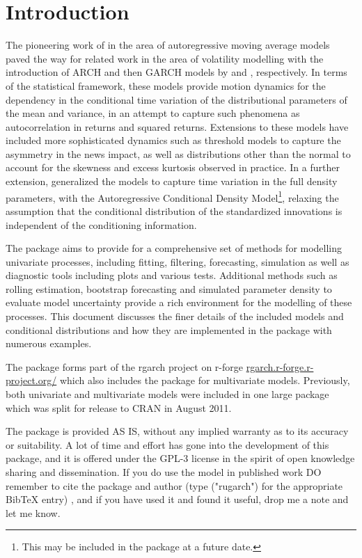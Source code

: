 \section{Introduction}
The pioneering work of \citet{Box2} in the area of autoregressive moving
average models paved the way for related work in the area of volatility
modelling with the introduction of ARCH and then GARCH models by \citet{Engle1}
and \citet{Bollerslev1}, respectively. In terms of the statistical framework,
these models provide motion dynamics for the dependency in the conditional
time variation of the distributional parameters of the mean and variance, in an
attempt to capture such phenomena as autocorrelation in returns and squared
returns. Extensions to these models have included more sophisticated dynamics
such as threshold models to capture the asymmetry in the news impact, as well
as distributions other than the normal to account for the skewness and excess
kurtosis observed in practice. In a further extension, \citet{HANSEN2}
generalized the \verb@GARCH@ models to capture time variation in the full density
parameters, with the Autoregressive Conditional Density Model\footnote{This may
be included in the package at a future date.}, relaxing the assumption that the
conditional distribution of the standardized innovations is independent of the
conditioning information.

The \verb@rugarch@ package aims to provide for a comprehensive set of methods
for modelling univariate \verb@GARCH@ processes, including fitting, filtering,
forecasting, simulation as well as diagnostic tools including plots and various
tests. Additional methods such as rolling estimation, bootstrap forecasting and
simulated parameter density to evaluate model uncertainty provide a rich
environment for the modelling of these processes. This document discusses the
finer details of the included models and conditional distributions and
how they are implemented in the package with numerous examples.

The \verb@rugarch@ package forms part of the rgarch project on r-forge
\url{rgarch.r-forge.r-project.org/} which also includes the \verb@rmgarch@
package for multivariate \verb@GARCH@ models. Previously, both univariate and
multivariate models were included in one large package which was split for
release to CRAN in August 2011.

The package is provided AS IS, without any implied warranty as to its accuracy
or suitability. A lot of time and effort has gone into the development of this
package, and it is offered under the GPL-3 license in the spirit of open
knowledge sharing and dissemination. If you do use the model in published work
DO remember to cite the package and author (type \verb@citation@("rugarch") for
the appropriate BibTeX entry) , and if you have used it and found it
useful, drop me a note and let me know.

